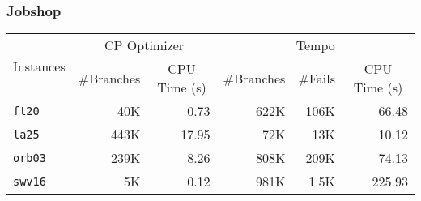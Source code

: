 \begin{frame}
\frametitle{Jobshop}


\vfill

\begin{center}
\begin{footnotesize}

\begin{tabular}{lrrrrr}
\toprule
\multirow{2}{*}{Instances}&  \multicolumn{2}{c}{CP Optimizer} & \multicolumn{3}{c}{Tempo}\\
\cmidrule(rr){2-3}\cmidrule(rr){4-6}
& \multicolumn{1}{c}{\#Branches} & \multicolumn{1}{c}{CPU Time (s)} & \multicolumn{1}{c}{\#Branches} & \multicolumn{1}{c}{\#Fails} & \multicolumn{1}{c}{CPU Time (s)} \\
\midrule

\texttt{ft20} & 40K & \cellcolor{green!50}0.73 & 622K & 106K & \cellcolor{red!50}66.48\\
\texttt{la25} & 443K & \cellcolor{red!50}17.95 & 72K & 13K & \cellcolor{green!50}10.12\\
\texttt{orb03} & 239K & \cellcolor{green!50}8.26 & 808K & 209K & \cellcolor{red!50}74.13\\
\texttt{swv16} & 5K & \cellcolor{green!50}0.12 & 981K & 1.5K & \cellcolor{red!50}225.93\\
\bottomrule
\end{tabular}



\end{footnotesize}
\end{center}


\end{frame}
